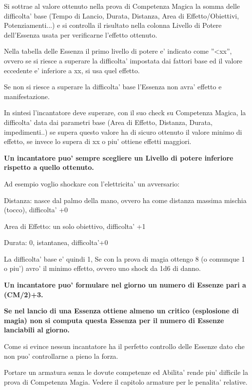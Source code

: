 \documentclass[a4paper,11pt,twoside,openany]{book}
\begin{document}
	Si sottrae al valore ottenuto nella prova di Competenza Magica la somma delle difficolta' base (Tempo di Lancio, Durata, Distanza, Area di Effetto/Obiettivi, Potenziamenti...) e si controlla il risultato nella colonna Livello di Potere dell'Essenza usata per verificarne l'effetto ottenuto.
	
	Nella tabella delle Essenza il primo livello di potere e' indicato come ''\textless xx'', ovvero se si riesce a superare la difficolta' impostata dai fattori base ed il valore eccedente e' inferiore a xx, si usa quel effetto.
	
	Se non si riesce a superare la difficolta' base l'Essenza non avra' effetto e manifestazione.
	
	In sintesi l'incantatore deve superare, con il suo check su Competenza Magica, la difficolta' data dai parametri base (Area di Effetto, Distanza, Durata, impedimenti..) se supera questo valore ha di sicuro ottenuto il valore minimo di effetto, se invece lo supera di xx o piu' ottiene effetti maggiori.
	
	\bigskip
	
	\textbf{Un incantatore puo' sempre scegliere un Livello di potere
		inferiore rispetto a quello ottenuto.}
	
	Ad esempio voglio shockare con l'elettricita' un avversario:
	
	Distanza: nasce dal palmo della mano, ovvero ha come distanza massima mischia (tocco), difficolta' +0
	
	Area di Effetto: un solo obiettivo, difficolta' +1
	
	Durata: 0, istantanea, difficolta'+0
	
	La difficolta' base e' quindi 1, Se con la prova di magia ottengo 8 (o comunque 1 o piu') avro' il minimo effetto, ovvero uno shock da 1d6 di danno.
	
	\bigskip
	
	\textbf{Un incantatore puo' formulare nel giorno un numero di Essenze pari a (CM/2)+3.}
	
	\textbf{Se nel lancio di una Essenza ottiene almeno un critico (esplosione di magia) non si computa questa Essenza per il numero di Essenze lanciabili al giorno.}
	
	Come si evince nessun incantatore ha il perfetto controllo delle Essenze dato che non puo' controllarne a pieno la forza.
	
	Portare un armatura senza le dovute competenze ed Abilita' rende piu' difficile la prova di Competenza Magia. Vedere il capitolo armature per le penalita' relative.
	
\end{document}
